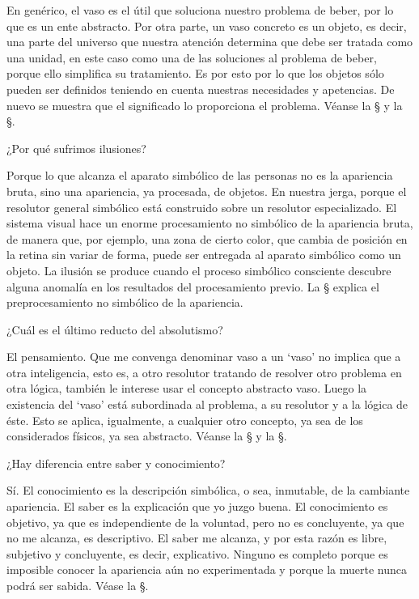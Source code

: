 En genérico, el vaso es el útil que soluciona nuestro problema de beber, por
lo que es un ente abstracto.  Por otra parte, un vaso concreto es un objeto,
es decir, una parte del universo que nuestra atención determina que debe ser
tratada como una unidad, en este caso como una de las soluciones al problema
de beber, porque ello simplifica su tratamiento. Es por esto por lo que los
objetos sólo pueden ser definidos teniendo en cuenta nuestras necesidades y
apetencias.  De nuevo se muestra que el significado lo proporciona el
problema.  Véanse la \S{} y la \S{}.

\Q ¿Por qué sufrimos ilusiones?

Porque lo que alcanza el aparato simbólico de las personas no es la
apariencia bruta, sino una apariencia, ya procesada, de objetos.  En nuestra
jerga, porque el resolutor general simbólico está construido sobre un
resolutor especializado.  El sistema visual hace un enorme procesamiento no
simbólico de la apariencia bruta, de manera que, por ejemplo, una zona de
cierto color, que cambia de posición en la retina sin variar de forma, puede
ser entregada al aparato simbólico como un objeto. La ilusión se produce
cuando el proceso simbólico consciente descubre alguna anomalía en los
resultados del procesamiento previo.  La \S{}
explica el preprocesamiento no simbólico de la apariencia.

\Q ¿Cuál es el último reducto del absolutismo?

El pensamiento.  Que me convenga denominar vaso a un `vaso' no implica que a
otra inteligencia, esto es, a otro resolutor tratando de resolver otro
problema en otra lógica, también le interese usar el concepto abstracto
vaso.  Luego la existencia del `vaso' está subordinada al problema, a su
resolutor y a la lógica de éste. Esto se aplica, igualmente, a cualquier
otro concepto, ya sea de los considerados físicos, ya sea abstracto. Véanse
la \S{} y la \S{}.

\Q ¿Hay diferencia entre saber y conocimiento?

Sí.  El conocimiento es la descripción simbólica, o sea, inmutable, de la
cambiante apariencia.  El saber es la explicación que yo juzgo buena. El
conocimiento es objetivo, ya que es independiente de la voluntad, pero no es
concluyente, ya que no me alcanza, es descriptivo.  El saber me alcanza, y
por esta razón es libre, subjetivo y concluyente, es decir, explicativo.
Ninguno es completo porque es imposible conocer la apariencia aún no
experimentada y porque la muerte nunca podrá ser sabida.  Véase la
\S{}.

